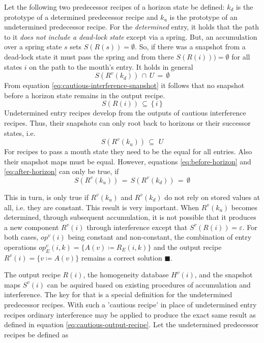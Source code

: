 \documentclass[12pt,a4paper]{scrartcl}
\begin{document}
Let the following two predecessor recipes of a horizon state be defined:
$k_d$ is the prototype of a determined predecessor recipe and $k_u$ is the
prototype of an undetermined predecessor recipe. For the \textit{determined}
entry, it holds that the path to it \textit{does not include a dead-lock state}
except via a spring. But, an accumulation over a spring state $s$ sets
$S(R(s))=\emptyset$. So, if there was a snapshot from a dead-lock state it must
pass the spring and from there $S(R(i)))=\emptyset$ for all states $i$ on the
path to the mouth's entry. It holds in general
\begin{equation} \label{eq:before-horizon}
        S(R^v(k_d))\,\cap\,U\,=\,\emptyset
\end{equation}
From equation \eqref{eq:cautious-interference-snapshot} it follows that no
snapshot before a horizon state remains in the output recipe.
\begin{equation}
        S(R(i))\,\subseteq\,\{\,i\,\}
\end{equation}
Undetermined entry recipes develop from the outputs of cautious interference 
recipes. Thus, their snapshots can only root back to horizons or their successor
states, i.e.
\begin{equation} \label{eq:after-horizon}
        S(R^v(k_u))\,\subseteq\,\,U
\end{equation}
For recipes to pass a mouth state they need to be the equal for all entries. Also
their snapshot maps must be equal. However, equations
\eqref{eq:before-horizon} and \eqref{eq:after-horizon} can only be true, if
\begin{equation} \label{eq:homogeneity-condition}
    S(R^v(k_u))\,=\,S(R^v(k_d))\,=\,\emptyset 
\end{equation}

This in turn, is only true if $R^v(k_u)$ and $R^v(k_d)$ do not rely on stored values
at all, i.e. they are constant. This result is very important. When $R^v(k_u)$
becomes determined, through subsequent accumulation, it is not possible that it
produces a new component $R^v(i)$ through interference except that
$S^v(R(i))=\varepsilon$.  For both cases, $op^v(i)$ being constant and
non-constant, the combination of entry operations $op^v_E(i,k) = \{ A(v) \coloneqq 
R_E(i,k) \}$ and the output recipe $R^v(i)=\{ v\coloneqq A(v) \}$ remains a correct
solution $\blacksquare$.  

The output recipe $R(i)$, the homogeneity database $H^v(i)$, and the snapshot
maps $S^v(i)$ can be aquired based on existing procedures of accumulation and
interference. The key for that is a special definition for the undetermined
predecessor recipes. With such a 'cautious recipe' in place of undetermined
entry recipes ordinary interference may be applied to produce the exact same
result as defined in equation \eqref{eq:cautious-output-recipe}.  Let the
undetermined predecessor recipes be defined as
\end{document}
